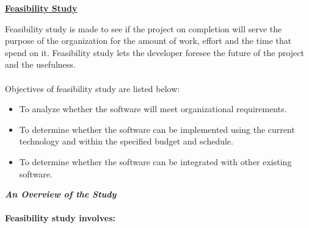\begin{center}\underline{\textbf{Feasibility Study}}\end{center}
Feasibility study is made to see if the project on completion will serve the purpose of the organization for the amount of work, effort and the time that spend on it. Feasibility study lets the developer foresee the future of the project and the usefulness.\\\\
Objectives of feasibility study are listed below:
\begin{itemize}
	\item To analyze whether the software will meet organizational requirements.
	\item To determine whether the software can be implemented using the current technology and within the specified budget and schedule.
	\item To determine whether the software can be integrated with other existing software.
\end{itemize}
\textbf{\emph{An Overview of the Study}}\\\\
\textbf{Feasibility study involves:}
